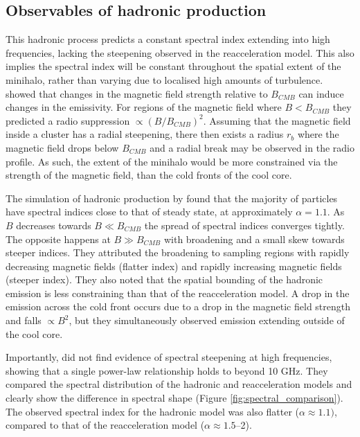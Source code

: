 \subsection{Observables of hadronic production}
This hadronic process predicts a constant spectral index extending into high frequencies, lacking the steepening observed in the reacceleration model. This also implies the spectral index will be constant throughout the spatial extent of the minihalo, rather than varying due to localised high amounts of turbulence. \citet{Keshet2010} showed that changes in the magnetic field strength relative to $B_{CMB}$ can induce changes in the emissivity. For regions of the magnetic field where $B < B_{CMB}$ they predicted a radio suppression $\propto(B/B_{CMB})^2$. Assuming that the magnetic field inside a cluster has a radial steepening, there then exists a radius $r_b$ where the magnetic field drops below $B_{CMB}$ and a radial break may be observed in the radio profile. As such, the extent of the minihalo would be more constrained via the strength of the magnetic field, than the cold fronts of the cool core.

The simulation of hadronic production by \citet{ZuHone2015} found that the majority of particles have spectral indices close to that of steady state, at approximately $\alpha=1.1$. As $B$ decreases towards $B \ll B_{CMB}$ the spread of spectral indices converges tightly. The opposite happens at $B \gg B_{CMB}$ with broadening and a small skew towards steeper indices. They attributed the broadening to sampling regions with rapidly decreasing magnetic fields (flatter index) and rapidly increasing magnetic fields (steeper index). They also noted that the spatial bounding of the hadronic emission is less constraining than that of the reacceleration model. A drop in the emission across the cold front occurs due to a drop in the magnetic field strength and falls $\propto B^2$, but they simultaneously observed emission extending outside of the cool core.

Importantly, \citet{ZuHone2015} did not find evidence of spectral steepening at high frequencies, showing that a single power-law relationship holds to beyond 10 GHz. They compared the spectral distribution of the hadronic and reacceleration models and clearly show the difference in spectral shape (Figure \ref{fig:spectral_comparison}). The observed spectral index for the hadronic model was also flatter ($\alpha\approx1.1)$, compared to that of the reacceleration model ($\alpha\approx1.5$--2).

